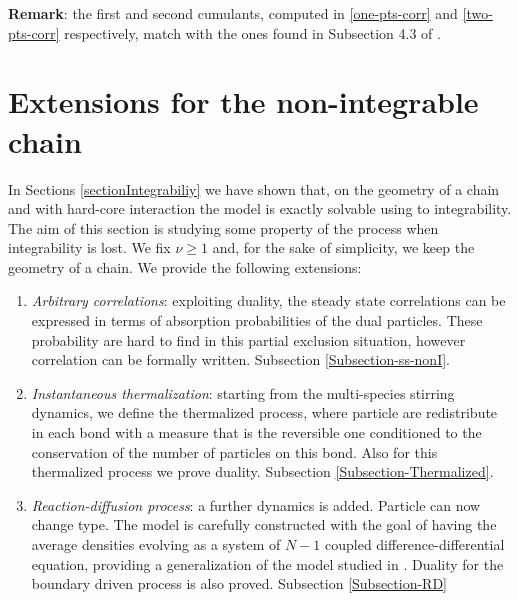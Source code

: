 \documentclass[10pt]{article}
\numberwithin{equation}{section}
\numberwithin{equation}{subsection}
\begin{document}
\textbf{Remark}: the first and second cumulants, computed in \eqref{one-pts-corr} and \eqref{two-pts-corr} respectively, match with the ones found in Subsection 4.3 of \cite{vanicat2017exact}.
\section{Extensions for the non-integrable chain}
In Sections \ref{sectionIntegrabiliy} we have shown that, on the geometry of a chain and with hard-core interaction the model is exactly solvable using to integrability.  
The aim of this section is studying some property of the process when integrability is lost. We fix $\nu\geq 1$ and, for the sake of simplicity, we keep the geometry of a chain. We provide the following extensions: 
\begin{enumerate}
	\item \textit{Arbitrary correlations}: exploiting duality, the steady state correlations can be expressed in terms of absorption probabilities of the dual particles. These probability are hard to find in this partial exclusion situation, however correlation can be formally written. Subsection \ref{Subsection-ss-nonI}.
	\item \textit{Instantaneous thermalization}: starting from the multi-species stirring dynamics, we define the thermalized process, where particle are redistribute in each bond with a measure that is the reversible one conditioned to the conservation of the number of particles on this bond. Also for this thermalized process we prove duality. Subsection \ref{Subsection-Thermalized}.
	\item \textit{Reaction-diffusion process}: a further dynamics is added. Particle can now change type. The model is carefully constructed with the goal of having the average densities evolving as a system of $N-1$ coupled difference-differential equation, providing a generalization of the model studied in \cite{casini2022uphill}. Duality for the boundary driven process is also proved. Subsection \ref{Subsection-RD}
\end{enumerate}
\end{document}
